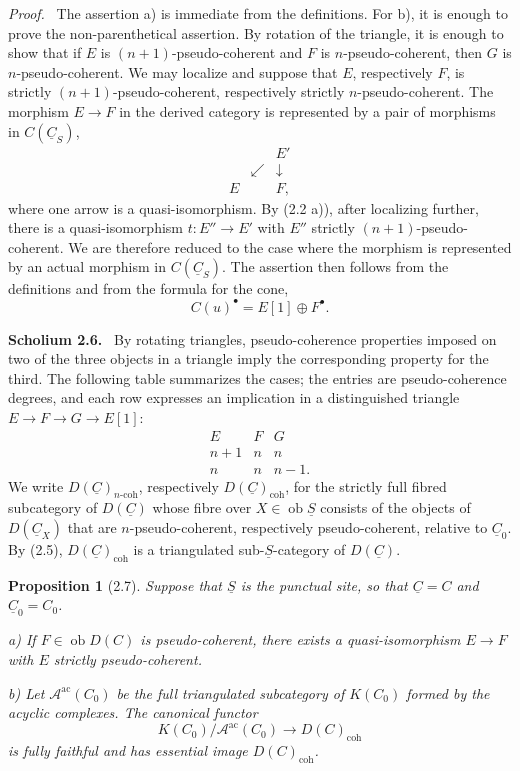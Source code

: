 \documentclass[13pt]{extarticle}
\newcommand{\uS}{\underline S}
\newcommand{\uC}{\underline C}
\newcommand{\ob}{\operatorname{ob}}
\newenvironment{statement}[1]{\par\medskip\noindent\textbf{#1.}\ }{\par\medskip}
\newenvironment{prooftext}[1][Proof]{\par\noindent\emph{#1.}\ }{\par\medskip}
\newtheorem*{proposition*}{Proposition}
\begin{document}
\begin{prooftext}
The assertion a) is immediate from the definitions. For b), it is enough to prove the non-parenthetical assertion. By rotation of the triangle, it is enough to show that if $E$ is $(n+1)$-pseudo-coherent and $F$ is $n$-pseudo-coherent, then $G$ is $n$-pseudo-coherent. We may localize and suppose that $E$, respectively $F$, is strictly $(n+1)$-pseudo-coherent, respectively strictly $n$-pseudo-coherent. The morphism $E\to F$ in the derived category is represented by a pair of morphisms in $C(\uC_S)$,
\[
\begin{array}{ccc}
&&E'\\
&\swarrow&\downarrow\\
E&&F,
\end{array}
\]
where one arrow is a quasi-isomorphism. By (2.2 a)), after localizing further, there is a quasi-isomorphism $t:E''\to E'$ with $E''$ strictly $(n+1)$-pseudo-coherent. We are therefore reduced to the case where the morphism is represented by an actual morphism in $C(\uC_S)$. The assertion then follows from the definitions and from the formula for the cone,
\[
C(u)^\bullet=E[1]\oplus F^\bullet .
\]
\end{prooftext}

\begin{statement}{Scholium 2.6}
By rotating triangles, pseudo-coherence properties imposed on two of the three objects in a triangle imply the corresponding property for the third. The following table summarizes the cases; the entries are pseudo-coherence degrees, and each row expresses an implication in a distinguished triangle $E\to F\to G\to E[1]$:
\[
\begin{array}{ccc}
E&F&G\\
n+1&n&n\\
n&n&n-1.
\end{array}
\]
We write $D(\uC)_{n\text{-}\mathrm{coh}}$, respectively $D(\uC)_{\mathrm{coh}}$, for the strictly full fibred subcategory of $D(\uC)$ whose fibre over $X\in\ob\uS$ consists of the objects of $D(\uC_X)$ that are $n$-pseudo-coherent, respectively pseudo-coherent, relative to $\uC_0$. By (2.5), $D(\uC)_{\mathrm{coh}}$ is a triangulated sub-$\uS$-category of $D(\uC)$.
\end{statement}

\begin{proposition*}[2.7]
Suppose that $\uS$ is the punctual site, so that $\uC=C$ and $\uC_0=C_0$.

\textup{a)} If $F\in\ob D(C)$ is pseudo-coherent, there exists a quasi-isomorphism $E\to F$ with $E$ strictly pseudo-coherent.

\textup{b)} Let $\mathcal A^{\mathrm{ac}}(C_0)$ be the full triangulated subcategory of $K(C_0)$ formed by the acyclic complexes. The canonical functor
\[
K(C_0)/\mathcal A^{\mathrm{ac}}(C_0)\longrightarrow D(C)_{\mathrm{coh}}
\]
is fully faithful and has essential image $D(C)_{\mathrm{coh}}$.
\end{proposition*}
\end{document}
